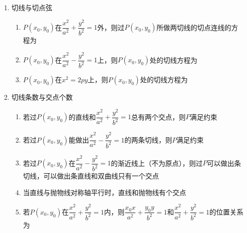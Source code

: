 \begin{enumerate}
\begin{enumerate}
        \item $\dfrac{x^2}{a^2}+\dfrac{y^2}{b^2} = 1$的中点坐标为$(x_0, y_0)$的弦的斜率为
        \item $\dfrac{x^2}{a^2}-\dfrac{y^2}{b^2} = 1$的弦中点$P(x_0, y_0)$和双曲线的位置关系是
        \item $\dfrac{x^2}{a^2}-\dfrac{y^2}{b^2} = 1$的中点坐标为$(x_0, y_0)$的弦的斜率为
        \item $y^2 = 2px(p>0)$的弦中点$P(x_0, y_0)$和抛物线的位置关系是
        \item $y^2 = 2px$的中点坐标为$(x_0, y_0)$的弦的斜率为
    \end{enumerate}
    \item 切线与切点弦
    \begin{enumerate}
        \item $P(x_0, y_0)$在$\dfrac{x^2}{a^2}+\dfrac{y^2}{b^2} = 1$外，则过$P(x_0, y_0)$所做两切线的切点连线的方程为
        \item $P(x_0, y_0)$在$\dfrac{x^2}{a^2}-\dfrac{y^2}{b^2} = 1$上，则$P(x_0, y_0)$处的切线方程为
        \item $P(x_0, y_0)$在$x^2 = 2py$上，则$P(x_0, y_0)$处的切线方程为
    \end{enumerate}
    \item 切线条数与交点个数
    \begin{enumerate}
        \item 若过$P(x_0, y_0)$的直线和$\dfrac{x^2}{a^2}+\dfrac{y^2}{b^2} = 1$总有两个交点，则$P$满足约束
        \item 若过$P(x_0, y_0)$能做出$\dfrac{x^2}{a^2}-\dfrac{y^2}{b^2} = 1$的两条切线，则$P$满足约束
        \item 若过$P(x_0, y_0)$在$\dfrac{x^2}{a^2}-\dfrac{y^2}{b^2} = 1$的渐近线上（不为原点），则过$P$可以做出条切线，可以做出条直线和双曲线只有一个交点
        \item 当直线与抛物线对称轴平行时，直线和抛物线有个交点
        \item 若$P(x_0, y_0)$在$\dfrac{x^2}{a^2}+\dfrac{y^2}{b^2} = 1$内，则$\dfrac{x_0x}{a^2}+\dfrac{y_0y}{b^2} = 1$和$\dfrac{x^2}{a^2}+\dfrac{y^2}{b^2} = 1$的位置关系为

\end{enumerate}
\end{enumerate}
